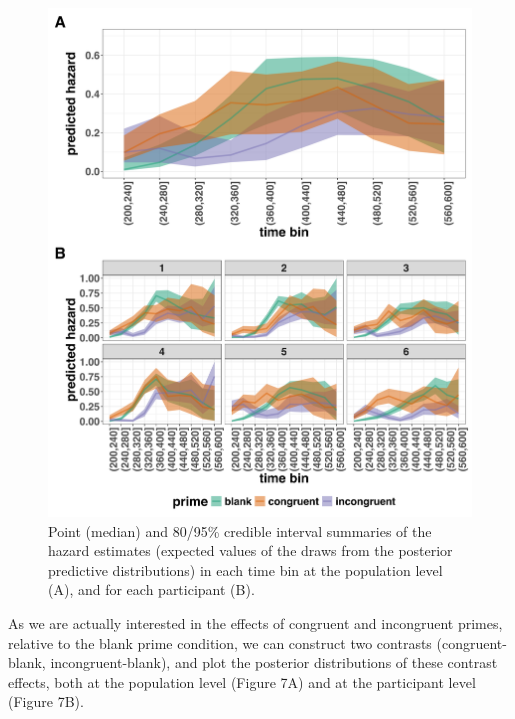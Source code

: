 \documentclass[
  man, donotrepeattitle,floatsintext]{apa6}
\begin{document}
\begin{figure}[H]

{\centering \includegraphics[width=0.8\linewidth,height=0.67\textheight,]{../Tutorial_2_Bayesian/figures/M1i_pred_combined} 

}

\caption{Point (median) and 80/95\% credible interval summaries of the hazard estimates (expected values of the draws from the posterior predictive distributions) in each time bin at the population level (A), and for each participant (B).}\label{fig:plot-pred-grand-effects}
\end{figure}

As we are actually interested in the effects of congruent and incongruent primes, relative to the blank prime condition, we can construct two contrasts (congruent-blank, incongruent-blank), and plot the posterior distributions of these contrast effects, both at the population level (Figure 7A) and at the participant level (Figure 7B).
\end{document}
